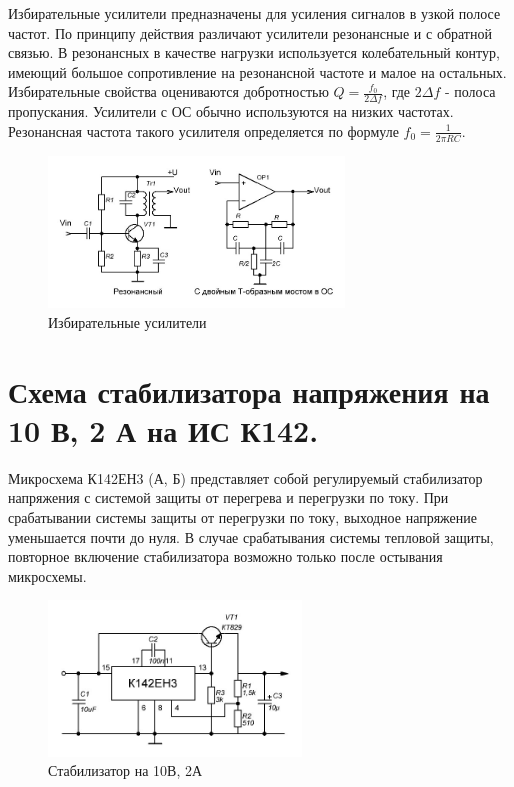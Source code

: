 \documentclass[unicode, 12pt, a4paper, oneside]{article}
\begin{document}
Избирательные усилители предназначены для усиления сигналов в узкой полосе частот. По принципу действия различают усилители резонансные и с обратной связью. В резонансных в качестве нагрузки используется колебательный контур, имеющий большое сопротивление на резонансной частоте и малое на остальных. Избирательные свойства оцениваются добротностью $Q = \frac{f_0}{2 \Delta f}$, где $2 \Delta f$ - полоса пропускания.
Усилители с ОС обычно используются на низких частотах. Резонансная частота такого усилителя определяется по формуле $f_0 = \frac{1}{2 \pi R C}$.
\begin{figure}[H]
\centering
\includegraphics[width=0.7\textwidth]{146.jpg}
\caption{Избирательные усилители}
\end{figure}

\section{Схема стабилизатора напряжения на 10 В, 2 А на ИС К142.}

Микросхема К142ЕН3 (А, Б) представляет собой регулируемый стабилизатор напряжения с системой защиты от перегрева и перегрузки по току. При срабатывании системы защиты от перегрузки по току, выходное напряжение уменьшается почти до нуля. В случае срабатывания системы тепловой защиты, повторное включение стабилизатора возможно только после остывания микросхемы.

\begin{figure}[H]
\centering
\includegraphics[width=0.6\textwidth]{147.jpg}
\caption{Стабилизатор на 10В, 2А}
\end{figure}
\end{document}
